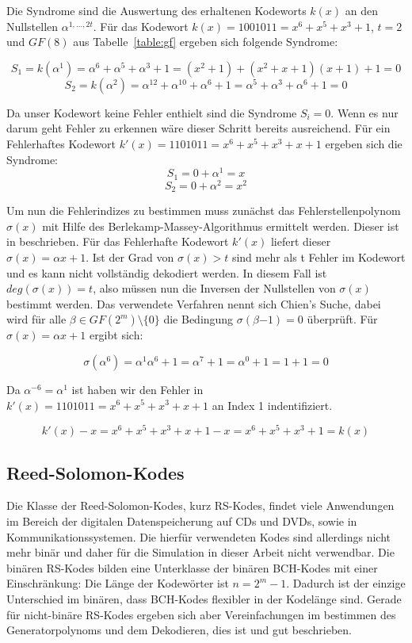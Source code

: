 Die Syndrome sind die Auswertung des erhaltenen Kodeworts $k(x)$ an den Nullstellen $\alpha^{1,...,2t}$. 
Für das Kodewort $k(x) = 1001011 = x^6 + x^5 + x^3 + 1$, $t=2$ und $GF(8)$ aus Tabelle~\ref{table:gf} ergeben sich folgende Syndrome:

$$S_1 = k(\alpha^1) = \alpha^6 + \alpha^5 + \alpha^3 + 1 = (x^2 +1) + (x^2+x+1)(x+1)+1 = 0$$
$$S_2 = k(\alpha^2) = \alpha^{12} + \alpha^{10} + \alpha^6 + 1 = \alpha^5 + \alpha^3 + \alpha^6 + 1 = 0 $$

Da unser Kodewort keine Fehler enthielt sind die Syndrome $S_i = 0$. Wenn es nur darum geht Fehler zu erkennen wäre dieser Schritt bereits ausreichend. Für ein Fehlerhaftes Kodewort $k'(x) = 1101011 = x^6 + x^5 + x^3 + x+1$ ergeben sich die Syndrome: 
$$S_1 = 0 + \alpha^1 = x$$
$$S_2 = 0 + \alpha^2 = x^2$$

Um nun die Fehlerindizes zu bestimmen muss zunächst das Fehlerstellenpolynom $\sigma(x)$ mit Hilfe des Berlekamp-Massey-Algorithmus ermittelt werden. Dieser ist in \cite[Kap 3.5.2]{morelos2006art} beschrieben. Für das Fehlerhafte Kodewort $k'(x)$ liefert dieser $\sigma(x) = \alpha x +1$. Ist der Grad von $\sigma(x) > t$ sind mehr als t Fehler im Kodewort und es kann nicht vollständig dekodiert werden. In diesem Fall ist $deg(\sigma(x)) = t$, also müssen nun die Inversen der Nullstellen von $\sigma(x)$ bestimmt werden. Das verwendete Verfahren nennt sich Chien's Suche, dabei wird für alle $\beta \in GF(2^m)\setminus\{0\}$ die Bedingung $\sigma(\beta{-1}) = 0$ überprüft.\cite[Kap. 3.5.5]{morelos2006art} Für $\sigma(x) = \alpha x +1$ ergibt sich:

$$\sigma(\alpha^6) = \alpha^1\alpha^6 +1 = \alpha^7 +1 = \alpha^0 + 1 = 1 + 1 = 0$$

Da $\alpha^{-6} = \alpha^1$ ist haben wir den Fehler in $k'(x) = 1101011 = x^6 + x^5 + x^3 + x+1$ an Index 1 indentifiziert.

$$k'(x) - x = x^6 + x^5 + x^3 + x+1 -x = x^6+x^5+x^3+1=k(x)$$



\subsection{Reed-Solomon-Kodes}

Die Klasse der Reed-Solomon-Kodes, kurz RS-Kodes, findet viele Anwendungen im Bereich der digitalen Datenspeicherung auf CDs und DVDs, sowie in Kommunikationssystemen.\cite[Kap. 4]{morelos2006art} Die hierfür verwendeten Kodes sind allerdings nicht mehr binär und daher für die Simulation in dieser Arbeit nicht verwendbar. Die binären RS-Kodes bilden eine Unterklasse der binären BCH-Kodes mit einer Einschränkung: Die Länge der Kodewörter ist $n = 2^m-1$.\cite[Kap 5.2]{huffman2010fundamentals} Dadurch ist der einzige Unterschied im binären, dass BCH-Kodes flexibler in der Kodelänge sind. Gerade für nicht-binäre RS-Kodes ergeben sich aber Vereinfachungen im bestimmen des Generatorpolynoms und dem Dekodieren, dies ist \cite[Kap. 4]{morelos2006art} und \cite[Kap. 5.2]{huffman2010fundamentals} gut beschrieben.
